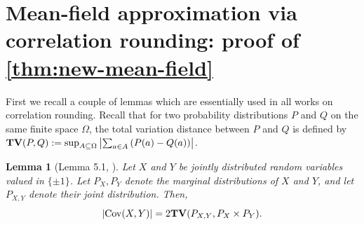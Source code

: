 \documentclass[11pt, oneside, english]{article}
\newcommand{\bE}{\mathbb{E}}
\newcommand{\Cov}{\mathrm{Cov}}
\newcommand{\E}{\bE}      %
\newcommand{\TV}{{\bf TV}}
\newcommand{\bone}{\mathbbm{1}}
\newtheorem{lemma}[theorem]{Lemma}
\theoremstyle{definition}
\theoremstyle{plain}
\begin{document}
\section{Mean-field approximation via correlation rounding: proof of \cref{thm:new-mean-field}}
\label{s:mfbounds}
First we recall a couple of lemmas which are essentially used in all works on correlation rounding. Recall that for two probability distributions $P$ and $Q$ on the same finite space $\Omega$, the total variation distance between $P$ and $Q$ is defined by
$\TV(P,Q):= \sup_{A\subseteq \Omega}\left|\sum_{a\in A} \left(P(a)-Q(a)\right)\right|$.
\begin{lemma}[Lemma 5.1, \cite{barak2011rounding}]\label{lem:tv-is-cov}
Let $X$ and $Y$ be jointly distributed random variables valued in $\{\pm 1\}$. Let $P_X,P_Y$ denote the marginal distributions of $X$ and $Y$, and let $P_{X,Y}$ denote their
joint distribution. Then,
\[ |\Cov(X,Y)| = 2\TV(P_{X,Y},P_X \times P_Y). \]
\end{lemma}

\end{document}

